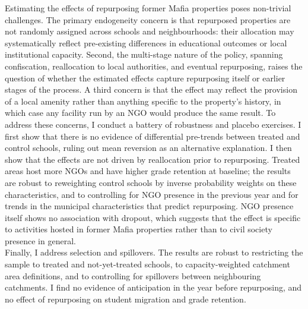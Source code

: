 \documentclass[12pt]{article}
\theoremstyle{plain}
\theoremstyle{plain}
\theoremstyle{plain}
\theoremstyle{definition}
\theoremstyle{plain}
\theoremstyle{definition}
\theoremstyle{plain}
\theoremstyle{remark}
\theoremstyle{definition}
\theoremstyle{definition}
\theoremstyle{plain}
\begin{document}
\medskip
Estimating the effects of repurposing former Mafia properties poses non-trivial challenges. The primary endogeneity concern is that repurposed properties are not randomly assigned across schools and neighbourhoods: their allocation may systematically reflect pre-existing differences in educational outcomes or local institutional capacity. Second, the multi-stage nature of the policy, spanning confiscation, reallocation to local authorities, and eventual repurposing, raises the question of whether the estimated effects capture repurposing itself or earlier stages of the process. A third concern is that the effect may reflect the provision of a local amenity rather than anything specific to the property's history, in which case any facility run by an NGO would produce the same result. To address these concerns, I conduct a battery of robustness and placebo exercises. I first show that there is no evidence of differential pre-trends between treated and control schools, ruling out mean reversion as an alternative explanation. I then show that the effects are not driven by reallocation prior to repurposing. Treated areas host more NGOs and have higher grade retention at baseline; the results are robust to reweighting control schools by inverse probability weights on these characteristics, and to controlling for NGO presence in the previous year and for trends in the municipal characteristics that predict repurposing. NGO presence itself shows no association with dropout, which suggests that the effect is specific to activities hosted in former Mafia properties rather than to civil society presence in general. \\
Finally, I address selection and spillovers. The results are robust to restricting the sample to treated and not-yet-treated schools, to capacity-weighted catchment area definitions, and to controlling for spillovers between neighbouring catchments. I find no evidence of anticipation in the year before repurposing, and no effect of repurposing on student migration and grade retention. \par
\medskip
\end{document}
